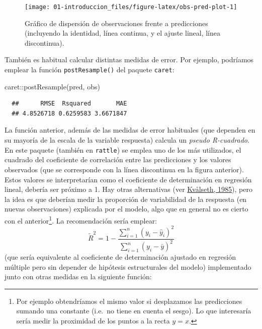 \documentclass[
]{book}
\newenvironment{Shaded}{\begin{snugshade}}{\end{snugshade}}
\newcommand{\FunctionTok}[1]{\textcolor[rgb]{0.00,0.00,0.00}{#1}}
\newcommand{\NormalTok}[1]{#1}
\newcommand{\SpecialCharTok}[1]{\textcolor[rgb]{0.00,0.00,0.00}{#1}}
\theoremstyle{break}
\theoremstyle{nonumberplain}
\begin{document}
\begin{figure}[!htb]

{\centering \texttt{[image: 01-introduccion\_files/figure-latex/obs-pred-plot-1]} 

}

\caption{Gráfico de dispersión de observaciones frente a predicciones (incluyendo la identidad, línea continua, y el ajuste lineal, línea discontinua).}\label{fig:obs-pred-plot}
\end{figure}

También es habitual calcular distintas medidas de error.
Por ejemplo, podríamos emplear la función \texttt{postResample()} del paquete \texttt{caret}:

\begin{Shaded}
\begin{Highlighting}[]
\NormalTok{caret}\SpecialCharTok{::}\FunctionTok{postResample}\NormalTok{(pred, obs)}
\end{Highlighting}
\end{Shaded}

\begin{verbatim}
  ##      RMSE  Rsquared       MAE 
  ## 4.8526718 0.6259583 3.6671847
\end{verbatim}

La función anterior, además de las medidas de error habituales (que dependen en su mayoría de la escala de la variable respuesta) calcula un \emph{pseudo R-cuadrado}.
En este paquete (también en \texttt{rattle}) se emplea uno de los más utilizados, el cuadrado del coeficiente de correlación entre las predicciones y los valores observados (que se corresponde con la línea discontinua en la figura anterior).
Estos valores se interpretarían como el coeficiente de determinación en regresión lineal, debería ser próximo a 1.
Hay otras alternativas (ver \protect\hyperlink{ref-kvaalseth1985cautionary}{Kvålseth, 1985}), pero la idea es que deberían medir la proporción de variabilidad de la respuesta (en nuevas observaciones) explicada por el modelo, algo que en general no es cierto con el anterior\footnote{Por ejemplo obtendríamos el mismo valor si desplazamos las predicciones sumando una constante (i.e.~no tiene en cuenta el sesgo).
  Lo que interesaría sería medir la proximidad de los puntos a la recta \(y=x\).}.
La recomendación sería emplear: \[\tilde R^2 = 1 - \frac{\sum_{i=1}^n(y_i - \hat y_i)^2}{\sum_{i=1}^n(y_i - \bar y)^2}\] (que sería equivalente al coeficiente de determinación ajustado en regresión múltiple pero sin depender de hipótesis estructurales del modelo) implementado junto con otras medidas en la siguiente función:
\end{document}
